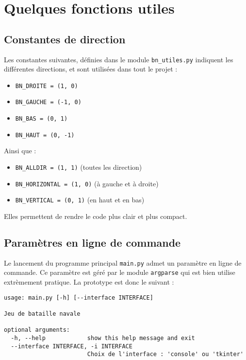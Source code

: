 \chapter{Quelques fonctions utiles}

\section{Constantes de direction}
Les constantes suivantes, définies dans le module \texttt{bn\_utiles.py} indiquent les différentes directions, et sont utilisées dans tout le projet :
\begin{itemize}
\item \texttt{BN\_DROITE = (1, 0)}
\item \texttt{BN\_GAUCHE = (-1, 0)}
\item \texttt{BN\_BAS = (0, 1)}
\item \texttt{BN\_HAUT = (0, -1)}
\end{itemize}
Ainsi que :
\begin{itemize}
\item \texttt{BN\_ALLDIR = (1, 1)} (toutes les direction)
\item \texttt{BN\_HORIZONTAL = (1, 0)} (à gauche et à droite)
\item \texttt{BN\_VERTICAL = (0, 1)} (en haut et en bas)
\end{itemize}
Elles permettent de rendre le code plus clair et plus compact.

\section{Paramètres en ligne de commande}
Le lancement du programme principal \texttt{main.py} admet un paramètre en ligne de commande. Ce paramètre est géré par le module \texttt{argparse} qui est bien utilise extrèmement pratique. La prototype est donc le suivant :

\begin{verbatim}
usage: main.py [-h] [--interface INTERFACE]

Jeu de bataille navale

optional arguments:
  -h, --help            show this help message and exit
  --interface INTERFACE, -i INTERFACE
                        Choix de l'interface : 'console' ou 'tkinter'
\end{verbatim}